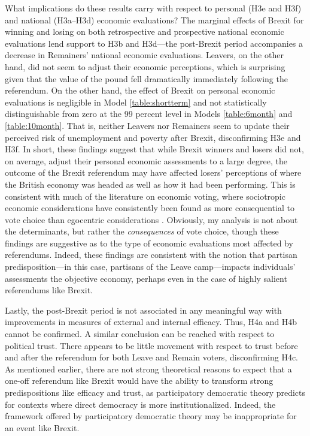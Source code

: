\documentclass[12pt, letter]{article}
\begin{document}
What implications do these results carry with respect to personal (H3e and H3f) and national (H3a--H3d) economic evaluations? The marginal effects of Brexit for winning and losing on both retrospective and prospective national economic evaluations lend support to H3b and H3d---the post-Brexit period accompanies a decrease in Remainers' national economic evaluations. Leavers, on the other hand, did not seem to adjust their economic perceptions, which is surprising given that the value of the pound fell dramatically immediately following the referendum. On the other hand, the effect of Brexit on personal economic evaluations is negligible in Model \ref{table:shortterm} and not statistically distinguishable from zero at the 99 percent level in Models \ref{table:6month} and \ref{table:10month}. That is, neither Leavers nor Remainers seem to update their perceived risk of unemployment and poverty after Brexit, disconfirming H3e and H3f. In short, these findings suggest that while Brexit winners and losers did not, on average, adjust their personal economic assessments to a large degree, the outcome of the Brexit referendum may have affected losers' perceptions of where the British economy was headed as well as how it had been performing. This is consistent with much of the literature on economic voting, where sociotropic economic considerations have consistently been found as more consequential to vote choice than egocentric considerations \parencite{lewis2013vp}. Obviously, my analysis is not about the determinants, but rather the \textit{consequences} of vote choice, though these findings are suggestive as to the type of economic evaluations most affected by referendums. Indeed, these findings are consistent with the notion that partisan predisposition---in this case, partisans of the Leave camp---impacts individuals' assessments the objective economy, perhaps even in the case of highly salient referendums like Brexit. 

Lastly, the post-Brexit period is not associated in any meaningful way with improvements in measures of external and internal efficacy. Thus, H4a and H4b cannot be confirmed. A similar conclusion can be reached with respect to political trust. There appears to be little movement with respect to trust before and after the referendum for both Leave and Remain voters, disconfirming H4c. As mentioned earlier, there are not strong theoretical reasons to expect that a one-off referendum like Brexit would have the ability to transform strong predispositions like efficacy and trust, as participatory democratic theory predicts for contexts where direct democracy is more institutionalized. Indeed, the framework offered by participatory democratic theory may be inappropriate for an event like Brexit. 
\end{document}
